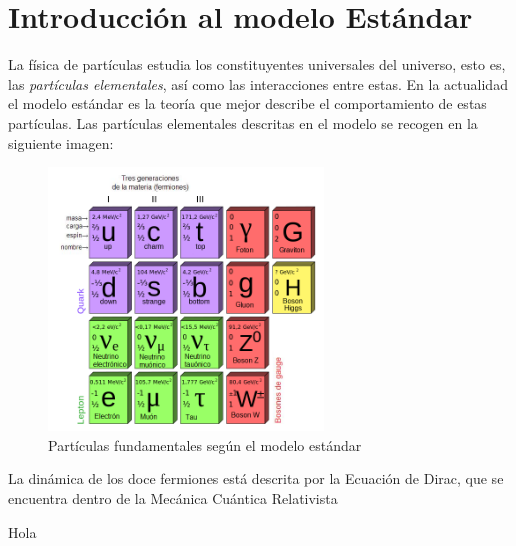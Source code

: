 
\chapter*{Introducción al modelo Estándar}

La física de partículas estudia los constituyentes universales del universo, esto es, las \textit{partículas elementales}, así como las interacciones entre estas. En la actualidad el modelo estándar es la teoría que mejor describe el comportamiento de estas partículas. Las partículas elementales descritas en el modelo se recogen en la siguiente imagen:

\begin{figure}[h!] \centering
	\includegraphics[width=0.65\textwidth]{Cuerpo/Ch_00/1_01_Modelo_Estandar.png}
	\caption{Partículas fundamentales según el modelo estándar}
\end{figure}
La dinámica de los doce fermiones está descrita por la Ecuación de Dirac, que se encuentra dentro de la Mecánica Cuántica Relativista

\newpage

Hola 